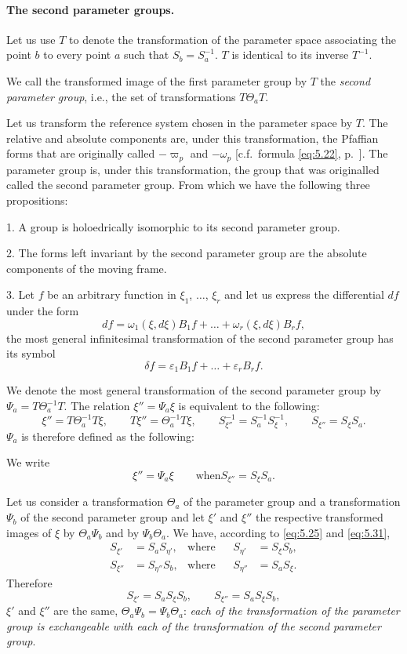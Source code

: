 \documentclass[leqno,11pt]{book}
\makeatletter
\numberwithin{equation}{chapter}
\theoremstyle{shape1}
\theoremstyle{shapesmall}
\let\old@epsilon\epsilon
\let\old@varepsilon\varepsilon
\let\epsilon\old@varepsilon
\let\varepsilon\old@epsilon
\newcommand{\vp}{\varpi}
\makeatother
\begin{document}
\paragraph{The second parameter groups.}
\label{sec:82}
{\small Let us use $T$ to denote the transformation of the parameter space associating the point $b$ to every point $a$ such that $S_{b}=S_{a}^{-1}$. $T$ is identical to its inverse $T^{-1}$.

We call the transformed image of the first parameter group by $T$ the \emph{second parameter group}, i.e., the set of transformations $T\Theta_{a}T$.

Let us transform the reference system chosen in the parameter space by $T$. The relative and absolute components are, under this transformation, the Pfaffian forms that are originally called $-\vp_{p}$ and $-\omega_{p}$ [c.f.~formula \eqref{eq:5.22}, p.~\pageref{eq:5.22}]. The parameter group is, under this transformation, the group that was originalled called the second parameter group. From which we have the following three propositions:

1. A group is holoedrically isomorphic to its second parameter group.

2. The forms left invariant by the second parameter group are the absolute components of the moving frame.

3. Let $f$ be an arbitrary function in $\xi_{1}$, $\dots$, $\xi_{r}$ and let us express the differential $df$ under the form
\[
df=\omega_{1}(\xi,d\xi)B_{1}f+\dots+\omega_{r}(\xi,d\xi)B_{r}f,
\]
the most general infinitesimal transformation of the second parameter group has its symbol
\[
\delta f=\epsilon_{1}B_{1}f+\dots+\epsilon_{r}B_{r}f.
\]

We denote the most general transformation of the second parameter group by $\Psi_{a}=T\Theta_{a}^{-1}T$. The relation $\xi''=\Psi_{a}\xi$ is equivalent to the following:
\[
\xi''=T\Theta_{a}^{-1}T\xi,\qquad T\xi''=\Theta_{a}^{-1}T\xi,\qquad S_{\xi''}^{-1}=S_{a}^{-1}S_{\xi}^{-1},\qquad S_{\xi''}=S_{\xi}S_{a}.
\]
$\Psi_{a}$ is therefore defined as the following:

We write
\begin{equation}
  \label{eq:5.31}
  \xi''=\Psi_{a}\xi\qquad\text{when} S_{\xi''}=S_{\xi}S_{a}.
\end{equation}

Let us consider a transformation $\Theta_{a}$ of the parameter group and a transformation $\Psi_{b}$ of the second parameter group and let $\xi'$ and $\xi''$ the respective transformed images of $\xi$ by $\Theta_{a}\Psi_{b}$ and by $\Psi_{b}\Theta_{a}$. We have, according to \eqref{eq:5.25} and \eqref{eq:5.31},
\[
\begin{aligned}
  S_{\xi'}&=S_{a}S_{\eta'},&\text{where}&&S_{\eta'}&=S_{\xi}S_{b},\\
  S_{\xi''}&=S_{\eta''}S_{b},&\text{where}&&S_{\eta''}&=S_{a}S_{\xi}.
\end{aligned}
\]
Therefore
\[
S_{\xi'}=S_{a}S_{\xi}S_{b},\qquad S_{\xi''}=S_{a}S_{\xi}S_{b},
\]
$\xi'$ and $\xi''$ are the same, $\Theta_{a}\Psi_{b}=\Psi_{b}\Theta_{a}$: \emph{each of the transformation of the parameter group is exchangeable with each of the transformation of the second parameter group}.
}
\end{document}
